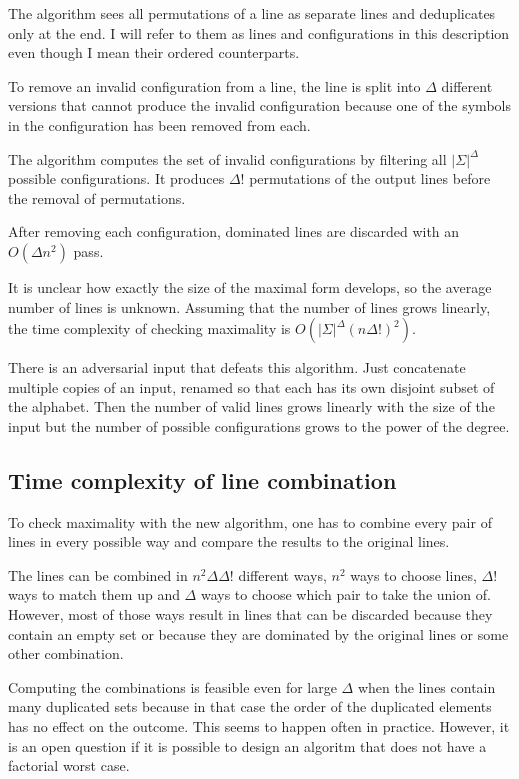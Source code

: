 \documentclass[english, 12pt, a4paper, sci, a-1b, online]{aaltothesis}
\begin{document}
The algorithm sees all permutations of a line as separate lines and deduplicates only at the end. I will refer to them as lines and configurations in this description even though I mean their ordered counterparts.

To remove an invalid configuration from a line, the line is split into $\Delta$ different versions that cannot produce the invalid configuration because one of the symbols in the configuration has been removed from each.

The algorithm computes the set of invalid configurations by filtering all $|\Sigma|^{\Delta}$ possible configurations. It produces $\Delta!$ permutations of the output lines before the removal of permutations.

After removing each configuration, dominated lines are discarded with an $O(\Delta n^2)$ pass.

It is unclear how exactly the size of the maximal form develops, so the average number of lines is unknown. Assuming that the number of lines grows linearly, the time complexity of checking maximality is $O(|\Sigma|^{\Delta}{(n\Delta!)}^2)$.

There is an adversarial input that defeats this algorithm. Just concatenate multiple copies of an input, renamed so that each has its own disjoint subset of the alphabet. Then the number of valid lines grows linearly with the size of the input but the number of possible configurations grows to the power of the degree.

\subsection{Time complexity of line combination}

To check maximality with the new algorithm, one has to combine every pair of lines in every possible way and compare the results to the original lines.

The lines can be combined in $n^2\Delta\Delta!$ different ways, $n^2$ ways to choose lines, $\Delta!$ ways to match them up and $\Delta$ ways to choose which pair to take the union of. However, most of those ways result in lines that can be discarded because they contain an empty set or because they are dominated by the original lines or some other combination.

Computing the combinations is feasible even for large $\Delta$ when the lines contain many duplicated sets because in that case the order of the duplicated elements has no effect on the outcome. This seems to happen often in practice. However, it is an open question if it is possible to design an algoritm that does not have a factorial worst case.
\end{document}
